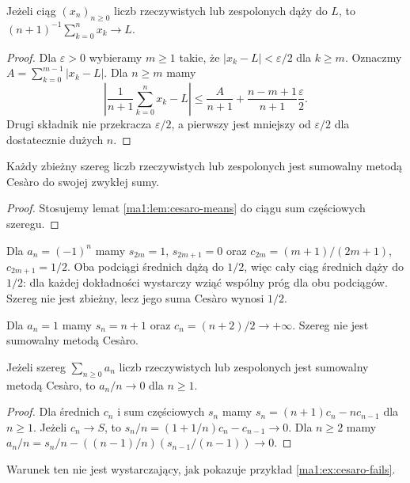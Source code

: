 \begin{lemat}
\label{ma1:lem:cesaro-means}
Jeżeli ciąg $(x_n)_{n\ge0}$ liczb rzeczywistych lub zespolonych dąży do $L$, to $(n+1)^{-1}\sum_{k=0}^n x_k\to L$.
\end{lemat}
\begin{proof}
Dla $\varepsilon>0$ wybieramy $m\ge1$ takie, że $|x_k-L|<\varepsilon/2$ dla $k\ge m$. Oznaczmy $A=\sum_{k=0}^{m-1}|x_k-L|$. Dla $n\ge m$ mamy
\[
 \left|\frac1{n+1}\sum_{k=0}^n x_k-L\right|
 \le\frac{A}{n+1}+\frac{n-m+1}{n+1}\frac{\varepsilon}{2}.
\]
Drugi składnik nie przekracza $\varepsilon/2$, a pierwszy jest mniejszy od $\varepsilon/2$ dla dostatecznie dużych $n$.
\end{proof}
\begin{wniosek}
\label{ma1:cor:cesaro-regular}
Każdy zbieżny szereg liczb rzeczywistych lub zespolonych jest sumowalny metodą Cesàro do swojej zwykłej sumy.
\end{wniosek}
\begin{proof}
Stosujemy lemat \ref{ma1:lem:cesaro-means} do ciągu sum częściowych szeregu.
\end{proof}
\begin{przyklad}
\label{ma1:ex:grandi-cesaro}
Dla $a_n=(-1)^n$ mamy $s_{2m}=1$, $s_{2m+1}=0$ oraz
$c_{2m}=(m+1)/(2m+1)$, $c_{2m+1}=1/2$. Oba podciągi średnich dążą do $1/2$, więc cały ciąg średnich dąży do $1/2$: dla każdej dokładności wystarczy wziąć wspólny próg dla obu podciągów. Szereg nie jest zbieżny, lecz jego suma Cesàro wynosi $1/2$.
\end{przyklad}
\begin{przyklad}
\label{ma1:ex:cesaro-fails}
Dla $a_n=1$ mamy $s_n=n+1$ oraz $c_n=(n+2)/2\to+\infty$. Szereg nie jest sumowalny metodą Cesàro.
\end{przyklad}
\begin{twierdzenie}
\label{ma1:thm:cesaro-term}
Jeżeli szereg $\sum_{n\ge0}a_n$ liczb rzeczywistych lub zespolonych jest sumowalny metodą Cesàro, to $a_n/n\to0$ dla $n\ge1$.
\end{twierdzenie}
\begin{proof}
Dla średnich $c_n$ i sum częściowych $s_n$ mamy $s_n=(n+1)c_n-nc_{n-1}$ dla $n\ge1$. Jeżeli $c_n\to S$, to $s_n/n=(1+1/n)c_n-c_{n-1}\to0$. Dla $n\ge2$ mamy $a_n/n=s_n/n-((n-1)/n)(s_{n-1}/(n-1))\to0$.
\end{proof}
Warunek ten nie jest wystarczający, jak pokazuje przykład \ref{ma1:ex:cesaro-fails}.

